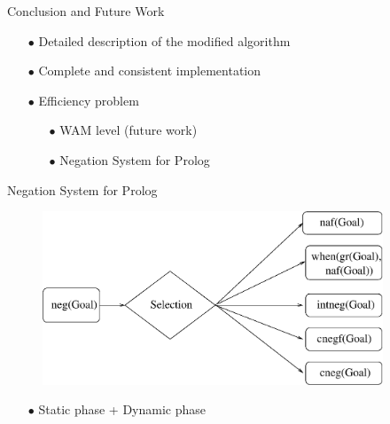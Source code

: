 \documentclass[pdf,slideColor,contemporain]{prosper}
\begin{document}
\begin{slide}{Conclusion and Future Work}

\vspace{1cm}
        \begin{itemize}
                \item[{\blue $\bullet$}] Detailed description of the modified {\blue algorithm}
                \item[{\blue $\bullet$}] Complete and consistent {\blue implementation}
\vspace{0.5cm}
                \item[$\bullet$] {\blue Efficiency} problem
                  \begin{itemize}
                  \item[{\blue $\bullet$}] WAM level (future work)
                  \item[{\blue $\bullet$}] Negation System for Prolog 
                  \end{itemize}
        \end{itemize}
\end{slide}
\begin{slide}{Negation System for Prolog}

  \begin{figure}
        \centering
        \includegraphics[width=4in]{modules.eps} 
  \end{figure}
\vspace{-0.5cm}
      \begin{itemize}
                \item[{\blue $\bullet$}] Static phase + Dynamic phase
      \end{itemize}

\end{slide}



\maketitle
\end{document}
